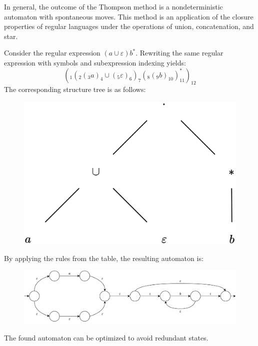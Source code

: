 In general, the outcome of the Thompson method is a nondeterministic automaton with spontaneous moves. 
This method is an application of the closure properties of regular languages under the operations of union, concatenation, and star.
\begin{example}
    Consider the regular expression $(a \cup \varepsilon)b^{\ast}$. 
    Rewriting the same regular expression with symbols and subexpression indexing yields:
    \[\left(_1\left(_2\left(_3a\right)_4 \cup \left(_5\varepsilon\right)_6\right)_7\left(_8\left(_9b\right)_{10}\right)_{11}^{\ast}\right)_{12}\]
    The corresponding structure tree is as follows:
    \begin{figure}[H]
        \centering
        \includegraphics[width=0.35\linewidth]{images/st.png}
    \end{figure}
    By applying the rules from the table, the resulting automaton is:
    \begin{figure}[H]
        \centering
        \includegraphics[width=0.75\linewidth]{images/at.png}
    \end{figure}
    The found automaton can be optimized to avoid redundant states.
\end{example}

